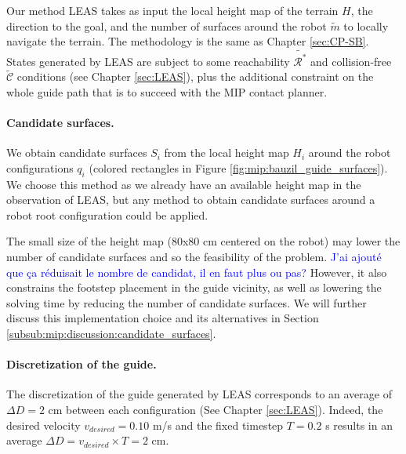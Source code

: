 Our method LEAS takes as input the local height map of the terrain $H$, the direction to the goal, and the number of surfaces around the robot $\tilde{m}$ to locally navigate the terrain. 
The methodology is the same as Chapter \ref{sec:CP-SB}.
States generated by LEAS are subject to some reachability $\tilde{\mathcal{R}^*}$ and collision-free $\tilde{\mathcal{C}}$ conditions (see Chapter \ref{sec:LEAS}), plus the additional constraint on the whole guide path that is to succeed with the MIP contact planner.


\paragraph{Candidate surfaces.}
We obtain candidate surfaces $S_i$ from the local height map $H_i$ around the robot configurations $q_i$ (colored rectangles in Figure \ref{fig:mip:bauzil_guide_surfaces}).
We choose this method as we already have an available height map in the observation of LEAS, but any method to obtain candidate surfaces around a robot root configuration could be applied.

The small size of the height map (80x80 cm centered on the robot) may lower the number of candidate surfaces and so the feasibility of the problem. 
 \textcolor{blue}{J'ai ajouté que ça réduisait le nombre de candidat, il en faut plus ou pas?}
However, it also constrains the footstep placement in the guide vicinity, as well as lowering the solving time by reducing the number of candidate surfaces.
We will further discuss this implementation choice and its alternatives in Section \ref{subsub:mip:discussion:candidate_surfaces}.


\paragraph{Discretization of the guide.}
The discretization of the guide generated by LEAS corresponds to an average of $\Delta D=2$ cm between each configuration (See Chapter \ref{sec:LEAS}). Indeed, the desired velocity $v_{desired}=0.10$ m/s and the fixed timestep $T=0.2$ s results in an average $\Delta D= v_{desired} \times T = 2$ cm.

